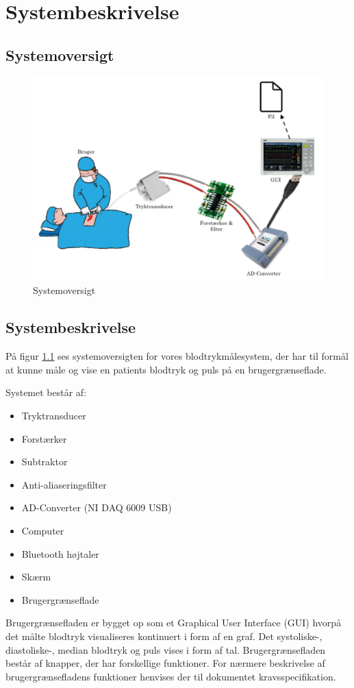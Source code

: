 \chapter{Systembeskrivelse}
\section{Systemoversigt}

	\begin{figure}[h!]
		\centering
		\includegraphics[width=0.55\linewidth]{Systembeskrivelse/Systemoversigt}
		\caption{Systemoversigt}
		\label{fig:Systemoversigt}
	\end{figure}
\vspace{1 cm}

\section{Systembeskrivelse}
På figur \ref{fig:Systemoversigt} ses systemoversigten for vores blodtrykmålesystem, der har til formål at kunne måle og vise en patients blodtryk og puls på en brugergrænseflade. 

Systemet består af:

\begin{itemize}
	\item Tryktransducer
	\item Forstærker
	\item Subtraktor
	\item Anti-aliaseringsfilter
	\item AD-Converter (NI DAQ 6009 USB)
	\item Computer
	\item Bluetooth højtaler
	\item Skærm
	\item Brugergrænseflade	
\end{itemize}

Brugergrænsefladen er bygget op som et Graphical User Interface (GUI) hvorpå det målte blodtryk visualiseres kontinuert i form af en graf. Det systoliske-, diastoliske-, median blodtryk og puls vises i form af tal. Brugergrænsefladen består af knapper, der har forskellige funktioner. For nærmere beskrivelse af brugergrænsefladens funktioner henvises der til dokumentet kravsspecifikation. \clearpage

